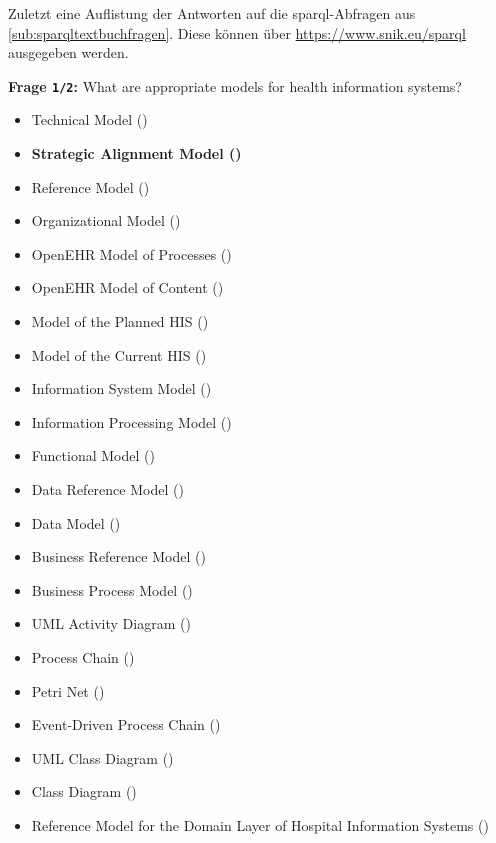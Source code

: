 Zuletzt eine Auflistung der Antworten auf die \ac{sparql}-Abfragen aus \cref{sub:sparqltextbuchfragen}.
Diese können über \url{https://www.snik.eu/sparql} ausgegeben werden.

\textbf{Frage \texttt{1/2}:} What are appropriate models for health information systems?

\begin{itemize}
  \item Technical Model ()
  \item \textbf{ Strategic Alignment Model ()}
  \item Reference Model ()
  \item Organizational Model ()
  \item OpenEHR Model of Processes ()
  \item OpenEHR Model of Content ()
  \item Model of the Planned HIS ()
  \item Model of the Current HIS ()
  \item Information System Model ()
  \item Information Processing Model ()
  \item Functional Model ()
  \item Data Reference Model ()
  \item Data Model ()
  \item Business Reference Model ()
  \item Business Process Model ()
  \item UML Activity Diagram ()
  \item Process Chain ()
  \item Petri Net ()
  \item Event-Driven Process Chain ()
  \item UML Class Diagram ()
  \item Class Diagram ()
  \item Reference Model for the Domain Layer of Hospital Information Systems ()

\end{itemize}
